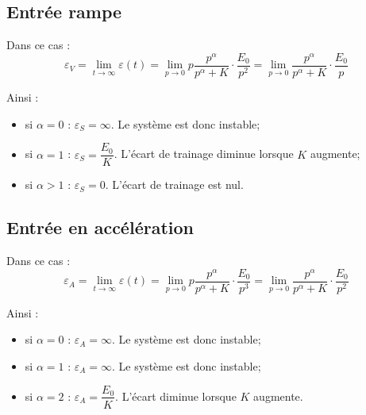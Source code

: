 \documentclass[10pt,fleqn]{article} %
\begin{document}
\subsection{Entrée rampe}
Dans ce cas : 
$$
\varepsilon_V =
\lim\limits_{t\to \infty} \varepsilon(t) 
= \lim\limits_{p\to 0} p \dfrac{p^\alpha}{p^\alpha+K} \cdot \dfrac{E_0}{p^2}
= \lim\limits_{p\to 0}  \dfrac{p^\alpha}{p^\alpha+K} \cdot \dfrac{E_0}{p}
$$

Ainsi :
\begin{itemize}
\item si $\alpha=0$ : $\varepsilon_S = \infty$. Le système est donc instable;
\item si $\alpha=1$ : $\varepsilon_S = \dfrac{E_0}{K}$. L'écart de trainage diminue lorsque $K$ augmente;
\item si $\alpha>1$ : $\varepsilon_S = 0$. L'écart de trainage est nul.
\end{itemize}

\begin{exemple}


\end{exemple}



\subsection{Entrée en accélération}
Dans ce cas : 
$$
\varepsilon_A =
\lim\limits_{t\to \infty} \varepsilon(t) 
= \lim\limits_{p\to 0} p \dfrac{p^\alpha}{p^\alpha+K} \cdot \dfrac{E_0}{p^3}
= \lim\limits_{p\to 0}  \dfrac{p^\alpha}{p^\alpha+K} \cdot \dfrac{E_0}{p^2}
$$

Ainsi :
\begin{itemize}
\item si $\alpha=0$ : $\varepsilon_A = \infty$. Le système est donc instable;
\item si $\alpha=1$ : $\varepsilon_A = \infty$. Le système est donc instable;
\item si $\alpha=2$ : $\varepsilon_A = \dfrac{E_0}{K}$. L'écart diminue lorsque $K$ augmente.
\end{itemize}
\end{document}
